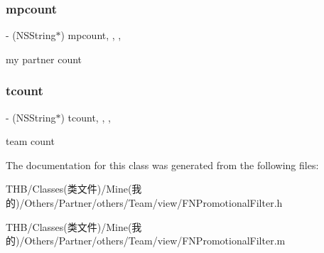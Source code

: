 \subsubsection{\texorpdfstring{mpcount}{mpcount}}
{\footnotesize\ttfamily -\/ (N\+S\+String$\ast$) mpcount\hspace{0.3cm}{\ttfamily [read]}, {\ttfamily [write]}, {\ttfamily [nonatomic]}, {\ttfamily [copy]}}

my partner count \mbox{\label{interface_f_n_promotional_filter_a1c5d42bef60ca79c00301b5a0229563b}} 
\subsubsection{\texorpdfstring{tcount}{tcount}}
{\footnotesize\ttfamily -\/ (N\+S\+String$\ast$) tcount\hspace{0.3cm}{\ttfamily [read]}, {\ttfamily [write]}, {\ttfamily [nonatomic]}, {\ttfamily [copy]}}

team count 

The documentation for this class was generated from the following files\+:\begin{DoxyCompactItemize}
\item 
T\+H\+B/\+Classes(类文件)/\+Mine(我的)/\+Others/\+Partner/others/\+Team/view/F\+N\+Promotional\+Filter.\+h\item 
T\+H\+B/\+Classes(类文件)/\+Mine(我的)/\+Others/\+Partner/others/\+Team/view/F\+N\+Promotional\+Filter.\+m\end{DoxyCompactItemize}
